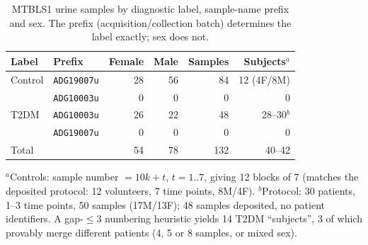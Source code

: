 \begin{table}[t]
\centering
\caption{MTBLS1 urine samples by diagnostic label, sample-name prefix and sex. The prefix
(acquisition/collection batch) determines the label exactly; sex does not.}
\label{tab:case3_crosstab}
\begin{tabular}{llrrrr}
\toprule
Label & Prefix & Female & Male & Samples & Subjects$^{a}$ \\
\midrule
Control & \texttt{ADG19007u} & 28 & 56 & 84 & 12 (4F/8M) \\
        & \texttt{ADG10003u} &  0 &  0 &  0 & 0 \\
T2DM    & \texttt{ADG10003u} & 26 & 22 & 48 & 28--30$^{b}$ \\
        & \texttt{ADG19007u} &  0 &  0 &  0 & 0 \\
\midrule
Total   &                    & 54 & 78 & 132 & 40--42 \\
\bottomrule
\end{tabular}

\smallskip
\footnotesize
$^{a}$Controls: sample number $=10k+t$, $t=1..7$, giving 12 blocks of 7 (matches the
deposited protocol: 12 volunteers, 7 time points, 8M/4F).
$^{b}$Protocol: 30 patients, 1--3 time points, 50 samples (17M/13F); 48 samples deposited, no
patient identifiers. A gap-$\le$3 numbering heuristic yields 14 T2DM ``subjects'', 3 of which
provably merge different patients (4, 5 or 8 samples, or mixed sex).
\end{table}
